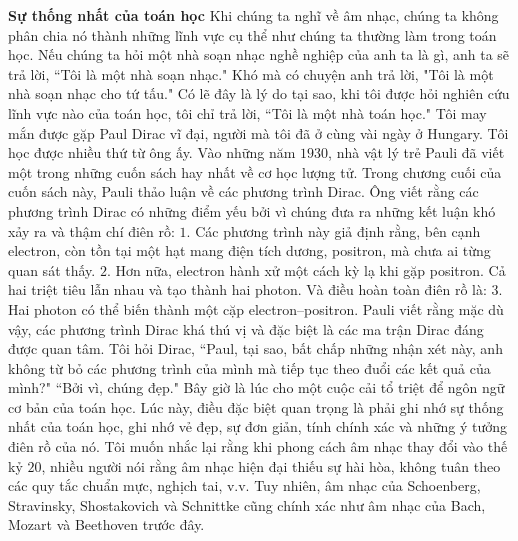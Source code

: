\begin{multicols}{2}
	\vskip 0.05cm
	\textbf{\color{quantoan}Sự thống nhất của toán học}
	\vskip 0.05cm
	Khi chúng ta nghĩ về âm nhạc, chúng ta không phân chia nó thành những lĩnh vực cụ thể như chúng ta thường làm trong toán học. Nếu chúng ta hỏi một nhà soạn nhạc nghề nghiệp của anh ta là gì, anh ta sẽ trả lời, ``Tôi là một nhà soạn nhạc." Khó mà có chuyện anh trả lời, "Tôi là một nhà soạn nhạc cho tứ tấu." Có lẽ đây là lý do tại sao, khi tôi được hỏi nghiên cứu lĩnh vực nào của toán học, tôi chỉ trả lời, ``Tôi là một nhà toán học."
	\vskip 0.03cm
	Tôi may mắn được gặp Paul Dirac vĩ đại, người mà tôi đã ở cùng vài ngày ở Hungary. Tôi học được nhiều thứ từ ông ấy.
	\vskip 0.03cm
	Vào những năm $1930$, nhà vật lý trẻ Pauli đã viết một trong những cuốn sách hay nhất về cơ học lượng tử. Trong chương cuối của cuốn sách này, Pauli thảo luận về các phương trình Dirac. Ông viết rằng các phương trình Dirac có những điểm yếu bởi vì chúng đưa ra những kết luận khó xảy ra và thậm chí \linebreak điên rồ:
	\vskip 0.03cm
	$1.$	Các phương trình này giả định rằng, bên cạnh electron, còn tồn tại một hạt mang điện tích dương, positron, mà chưa ai từng quan sát thấy.
	\vskip 0.03cm
	$2.$	Hơn nữa, electron hành xử một cách kỳ lạ khi gặp positron. Cả hai triệt tiêu lẫn nhau và tạo thành hai photon.
	\vskip 0.03cm
	Và điều hoàn toàn điên rồ là:
	\vskip 0.03cm
	$3.$	Hai photon có thể biến thành một cặp electron--positron.
	\vskip 0.03cm
	Pauli viết rằng mặc dù vậy, các phương trình Dirac khá thú vị và đặc biệt là các ma trận Dirac đáng được quan tâm.
	\vskip 0.03cm
	Tôi hỏi Dirac, ``Paul, tại sao, bất chấp những nhận xét này, anh không từ bỏ các phương trình của mình mà tiếp tục theo đuổi các kết quả của mình?"
	\vskip 0.03cm
	``Bởi vì, chúng đẹp."
	\vskip 0.03cm
	Bây giờ là lúc cho một cuộc cải tổ triệt để ngôn ngữ cơ bản của toán học. Lúc này, điều đặc biệt quan trọng là phải ghi nhớ sự thống nhất của toán học, ghi nhớ vẻ đẹp, sự đơn giản, tính chính xác và những ý tưởng điên rồ của nó. Tôi muốn nhắc lại rằng khi phong cách âm nhạc thay đổi vào thế kỷ $20$, nhiều người nói rằng âm nhạc hiện đại thiếu sự hài hòa, không tuân theo các quy tắc chuẩn mực, nghịch tai, v.v. Tuy nhiên, âm nhạc của Schoenberg, Stravinsky, Shostakovich và Schnittke cũng chính xác như âm nhạc của Bach, Mozart và Beethoven trước đây.
\end{multicols}